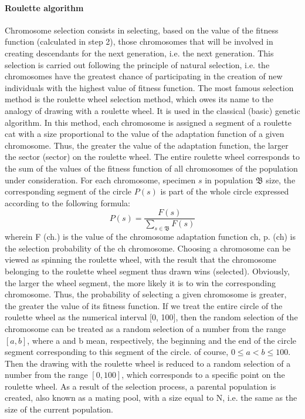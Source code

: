 \paragraph{Roulette algorithm} 
Chromosome selection consists in selecting, based on the value of the fitness function 
(calculated in step 2), those chromosomes that will be involved in creating descendants for 
the next generation, i.e. the next generation. 
This selection is carried out following the principle of natural selection, i.e. the 
chromosomes have the greatest chance of participating in the creation of new individuals
with the highest value of fitness function. The most famous selection method is the roulette 
wheel selection method, which owes its name to the analogy of drawing with a roulette wheel. 
It is used in the classical (basic) genetic algorithm. In this method, each chromosome is 
assigned a segment of a roulette cat with a size proportional to the value of the adaptation 
function of a given chromosome. 
Thus, the greater the value of the adaptation function, the larger the sector (sector) on 
the roulette wheel. 
The entire roulette wheel corresponds to the sum of the values of the fitness function of 
all chromosomes of the population under consideration. For each chromosome, 
specimen $s$ in population $\mathfrak{B}$ size, the corresponding segment of the 
circle $P(s)$ is part of the whole circle expressed according to the following formula:
\begin{equation}
	P(s) = \frac{F(s)}{\sum_{s \in \mathfrak{B}}F(s)}
\end{equation}
wherein F (ch.) is the value of the chromosome adaptation function ch, p. (ch) is 
the selection probability of the ch chromosome. 
Choosing a chromosome can be viewed as spinning the roulette wheel, with the result that
the chromosome belonging to the roulette wheel segment thus drawn wins (selected). 
Obviously, the larger the wheel segment, the more likely it is to win the corresponding 
chromosome. 
Thus, the probability of selecting a given chromosome is greater, the greater the value 
of its fitness function. 
If we treat the entire circle of the roulette wheel as the numerical interval [0, 100], 
then the random selection of the chromosome can be treated as a random selection of a 
number from the range $[a, b]$, where a and b mean, respectively, the beginning and the 
end of the circle segment corresponding to this segment of the circle. 
 of course, $0 \leq a < b \leq 100$. Then the drawing with the roulette wheel is reduced to a 
 random selection of a number from the range $[0,100]$, 
 which corresponds to a specific point on the roulette wheel. 
 As a result of the selection process, a parental population is created, also known as 
 a mating pool, with a size equal to N, i.e. the same as the size of the current population.


